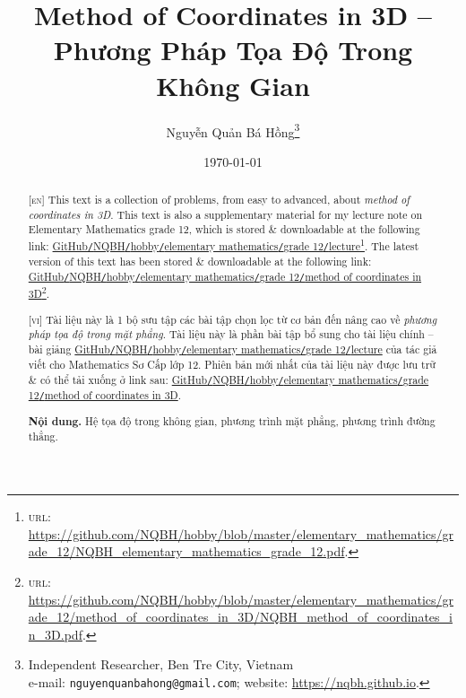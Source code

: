 \documentclass{article}
\title{Method of Coordinates in 3D -- Phương Pháp Tọa Độ Trong Không Gian}
\author{Nguyễn Quản Bá Hồng\footnote{Independent Researcher, Ben Tre City, Vietnam\\e-mail: \texttt{nguyenquanbahong@gmail.com}; website: \url{https://nqbh.github.io}.}}
\date{\today}
\begin{document}
\maketitle
\begin{abstract}
	\textsc{[en]} This text is a collection of problems, from easy to advanced, about \textit{method of coordinates in 3D}. This text is also a supplementary material for my lecture note on Elementary Mathematics grade 12, which is stored \& downloadable at the following link: \href{https://github.com/NQBH/hobby/blob/master/elementary_mathematics/grade_12/NQBH_elementary_mathematics_grade_12.pdf}{GitHub\texttt{/}NQBH\texttt{/}hobby\texttt{/}elementary mathematics\texttt{/}grade 12\texttt{/}lecture}\footnote{\textsc{url}: \url{https://github.com/NQBH/hobby/blob/master/elementary_mathematics/grade_12/NQBH_elementary_mathematics_grade_12.pdf}.}. The latest version of this text has been stored \& downloadable at the following link: \href{https://github.com/NQBH/hobby/blob/master/elementary_mathematics/grade_12/method_of_coordinates_in_3D/NQBH_method_of_coordinates_in_3D.pdf}{GitHub\texttt{/}NQBH\texttt{/}hobby\texttt{/}elementary mathematics\texttt{/}grade 12\texttt{/}method of coordinates in 3D}\footnote{\textsc{url}: \url{https://github.com/NQBH/hobby/blob/master/elementary_mathematics/grade_12/method_of_coordinates_in_3D/NQBH_method_of_coordinates_in_3D.pdf}.}.
	\vspace{2mm}
	
	\textsc{[vi]} Tài liệu này là 1 bộ sưu tập các bài tập chọn lọc từ cơ bản đến nâng cao về \textit{phương pháp tọa độ trong mặt phẳng}. Tài liệu này là phần bài tập bổ sung cho tài liệu chính -- bài giảng \href{https://github.com/NQBH/hobby/blob/master/elementary_mathematics/grade_12/NQBH_elementary_mathematics_grade_12.pdf}{GitHub\texttt{/}NQBH\texttt{/}hobby\texttt{/}elementary mathematics\texttt{/}grade 12\texttt{/}lecture} của tác giả viết cho Mathematics Sơ Cấp lớp 12. Phiên bản mới nhất của tài liệu này được lưu trữ \& có thể tải xuống ở link sau: \href{https://github.com/NQBH/hobby/blob/master/elementary_mathematics/grade_12/method_of_coordinates_in_3D/NQBH_method_of_coordinates_in_3D.pdf}{GitHub\texttt{/}NQBH\texttt{/}hobby\texttt{/}elementary mathematics\texttt{/}grade 12\texttt{/}method of coordinates in 3D}.
	
	\textsf{\textbf{Nội dung.} Hệ tọa độ trong không gian, phương trình mặt phẳng, phương trình đường thẳng.}
\end{abstract}
\tableofcontents
\newpage
\end{document}
